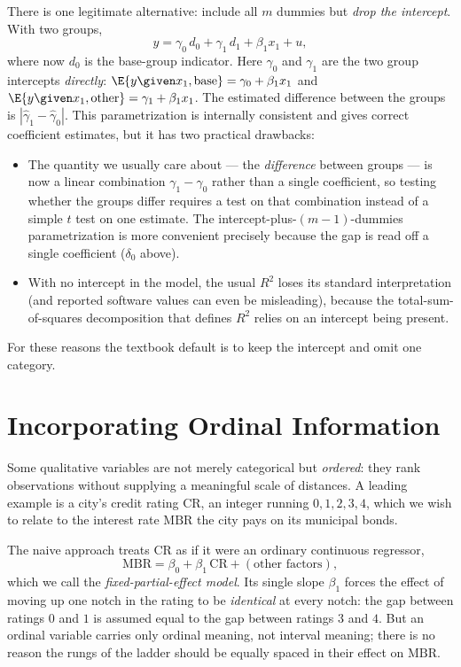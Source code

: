 There is one legitimate alternative: include all $m$ dummies but \emph{drop the intercept}. With two groups,
\[
y = \gamma_0 \, d_0 + \gamma_1 \, d_1 + \beta_1 x_1 + u,
\]
where now $d_0$ is the base-group indicator. Here $\gamma_0$ and $\gamma_1$ are the two group intercepts \emph{directly}: $\E{y\given x_1, \text{base}} = \gamma_0 + \beta_1 x_1$ and $\E{y\given x_1, \text{other}} = \gamma_1 + \beta_1 x_1$. The estimated difference between the groups is $|\widehat{\gamma}_1 - \widehat{\gamma}_0|$. This parametrization is internally consistent and gives correct coefficient estimates, but it has two practical drawbacks:
\begin{itemize}
\item The quantity we usually care about --- the \emph{difference} between groups --- is now a linear combination $\gamma_1-\gamma_0$ rather than a single coefficient, so testing whether the groups differ requires a test on that combination instead of a simple $t$ test on one estimate. The intercept-plus-$(m-1)$-dummies parametrization is more convenient precisely because the gap is read off a single coefficient ($\delta_0$ above).
\item With no intercept in the model, the usual $R^2$ loses its standard interpretation (and reported software values can even be misleading), because the total-sum-of-squares decomposition that defines $R^2$ relies on an intercept being present.
\end{itemize}
For these reasons the textbook default is to keep the intercept and omit one category.

\section{Incorporating Ordinal Information}

Some qualitative variables are not merely categorical but \emph{ordered}: they rank observations without supplying a meaningful scale of distances. A leading example is a city's credit rating $\text{CR}$, an integer running $0,1,2,3,4$, which we wish to relate to the interest rate $\text{MBR}$ the city pays on its municipal bonds.

The naive approach treats $\text{CR}$ as if it were an ordinary continuous regressor,
\[
\text{MBR} = \beta_0 + \beta_1 \, \text{CR} + (\text{other factors}),
\]
which we call the \emph{fixed-partial-effect model}. Its single slope $\beta_1$ forces the effect of moving up one notch in the rating to be \emph{identical} at every notch: the gap between ratings $0$ and $1$ is assumed equal to the gap between ratings $3$ and $4$. But an ordinal variable carries only ordinal meaning, not interval meaning; there is no reason the rungs of the ladder should be equally spaced in their effect on $\text{MBR}$.

